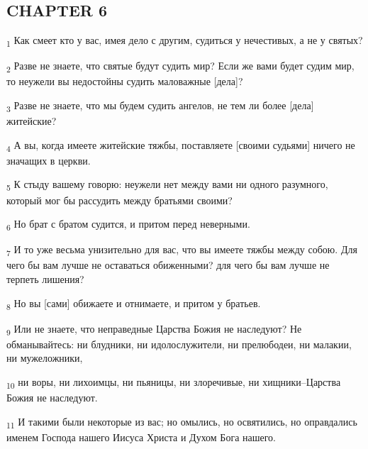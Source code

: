\subsection{CHAPTER 6}
\begin{tcolorbox}
\textsubscript{1} Как смеет кто у вас, имея дело с другим, судиться у нечестивых, а не у святых?
\end{tcolorbox}
\begin{tcolorbox}
\textsubscript{2} Разве не знаете, что святые будут судить мир? Если же вами будет судим мир, то неужели вы недостойны судить маловажные [дела]?
\end{tcolorbox}
\begin{tcolorbox}
\textsubscript{3} Разве не знаете, что мы будем судить ангелов, не тем ли более [дела] житейские?
\end{tcolorbox}
\begin{tcolorbox}
\textsubscript{4} А вы, когда имеете житейские тяжбы, поставляете [своими судьями] ничего не значащих в церкви.
\end{tcolorbox}
\begin{tcolorbox}
\textsubscript{5} К стыду вашему говорю: неужели нет между вами ни одного разумного, который мог бы рассудить между братьями своими?
\end{tcolorbox}
\begin{tcolorbox}
\textsubscript{6} Но брат с братом судится, и притом перед неверными.
\end{tcolorbox}
\begin{tcolorbox}
\textsubscript{7} И то уже весьма унизительно для вас, что вы имеете тяжбы между собою. Для чего бы вам лучше не оставаться обиженными? для чего бы вам лучше не терпеть лишения?
\end{tcolorbox}
\begin{tcolorbox}
\textsubscript{8} Но вы [сами] обижаете и отнимаете, и притом у братьев.
\end{tcolorbox}
\begin{tcolorbox}
\textsubscript{9} Или не знаете, что неправедные Царства Божия не наследуют? Не обманывайтесь: ни блудники, ни идолослужители, ни прелюбодеи, ни малакии, ни мужеложники,
\end{tcolorbox}
\begin{tcolorbox}
\textsubscript{10} ни воры, ни лихоимцы, ни пьяницы, ни злоречивые, ни хищники--Царства Божия не наследуют.
\end{tcolorbox}
\begin{tcolorbox}
\textsubscript{11} И такими были некоторые из вас; но омылись, но освятились, но оправдались именем Господа нашего Иисуса Христа и Духом Бога нашего.
\end{tcolorbox}
